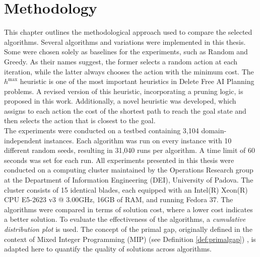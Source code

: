 \chapter{Methodology}
\label{ch:methodology}
This chapter outlines the methodological approach used to compare the selected algorithms.
Several algorithms and variations were implemented in this thesis. Some
were chosen solely as baselines for the experiments, such as Random and Greedy.
As their names suggest, the former selects a random action at each iteration, while the latter
always chooses the action with the minimum cost.
The $h^{\max}$ heuristic \cite{bonet2001planning} is one of the most important
heuristics in Delete Free AI Planning problems. A revised version of this heuristic, incorporating
a pruning logic, is proposed in this work.
Additionally, a novel heuristic was developed, which assigns to each action the cost of the shortest path to reach the goal
state and then selects the action that is closest to the goal.\\
The experiments were conducted on a testbed containing 3,104 domain-independent instances.
Each algorithm was run on every instance with 10 different random seeds, resulting in 31,040 runs
per algorithm. A time limit of 60 seconds was set for each run.
All experiments presented in this thesis were conducted on a computing cluster maintained by the Operations Research group at the
Department of Information Engineering (DEI), University of Padova.
The cluster consists of 15 identical blades, each equipped with an Intel(R) Xeon(R) CPU E5-2623 v3 @ 3.00GHz, 16GB of RAM, and running Fedora 37.
The algorithms were compared in terms of solution cost, where a lower cost indicates a better solution.
To evaluate the effectiveness of the algorithms, a \textit{cumulative distribution plot} is used.
The concept of the primal gap, originally defined in the context of Mixed Integer Programming (MIP)
(see Definition \ref{def:primalgap}) \cite{berthold2013measuring}, is adapted here to quantify the quality of solutions across algorithms.

